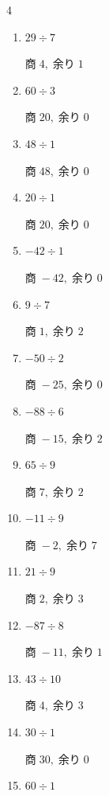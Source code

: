 \begin{multicols}{4}
\begin{enumerate}
  \item $29 \div 7$

        $商\; 4,\; 余り\; 1$

  \item $60 \div 3$

        $商\; 20,\; 余り\; 0$

  \item $48 \div 1$

        $商\; 48,\; 余り\; 0$

  \item $20 \div 1$

        $商\; 20,\; 余り\; 0$

  \item $-42 \div 1$

        $商\; -42,\; 余り\; 0$

  \item $9 \div 7$

        $商\; 1,\; 余り\; 2$

  \item $-50 \div 2$

        $商\; -25,\; 余り\; 0$

  \item $-88 \div 6$

        $商\; -15,\; 余り\; 2$

  \item $65 \div 9$

        $商\; 7,\; 余り\; 2$

  \item $-11 \div 9$

        $商\; -2,\; 余り\; 7$

  \item $21 \div 9$

        $商\; 2,\; 余り\; 3$

  \item $-87 \div 8$

        $商\; -11,\; 余り\; 1$

  \item $43 \div 10$

        $商\; 4,\; 余り\; 3$

\columnbreak %

\resetques

  \item $30 \div 1$

        $商\; 30,\; 余り\; 0$

  \item $60 \div 1$


\end{enumerate}
\end{multicols}
